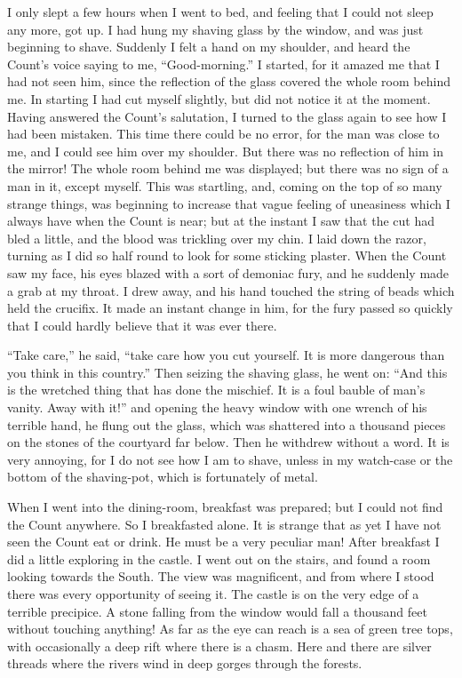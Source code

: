 \documentclass[12pt,openright]{book}
\begin{document}
I only slept a few hours when I went to bed, and feeling that I could not sleep any more, got up. I had hung my shaving glass by the window, and was just beginning to shave. Suddenly I felt a hand on my shoulder, and heard the Count’s voice saying to me, “Good-morning.” I started, for it amazed me that I had not seen him, since the reflection of the glass covered the whole room behind me. In starting I had cut myself slightly, but did not notice it at the moment. Having answered the Count’s salutation, I turned to the glass again to see how I had been mistaken. This time there could be no error, for the man was close to me, and I could see him over my shoulder. But there was no reflection of him in the mirror! The whole room behind me was displayed; but there was no sign of a man in it, except myself. This was startling, and, coming on the top of so many strange things, was beginning to increase that vague feeling of uneasiness which I always have when the Count is near; but at the instant I saw that the cut had bled a little, and the blood was trickling over my chin. I laid down the razor, turning as I did so half round to look for some sticking plaster. When the Count saw my face, his eyes blazed with a sort of demoniac fury, and he suddenly made a grab at my throat. I drew away, and his hand touched the string of beads which held the crucifix. It made an instant change in him, for the fury passed so quickly that I could hardly believe that it was ever there.

“Take care,” he said, “take care how you cut yourself. It is more dangerous than you think in this country.” Then seizing the shaving glass, he went on: “And this is the wretched thing that has done the mischief. It is a foul bauble of man’s vanity. Away with it!” and opening the heavy window with one wrench of his terrible hand, he flung out the glass, which was shattered into a thousand pieces on the stones of the courtyard far below. Then he withdrew without a word. It is very annoying, for I do not see how I am to shave, unless in my watch-case or the bottom of the shaving-pot, which is fortunately of metal.

When I went into the dining-room, breakfast was prepared; but I could not find the Count anywhere. So I breakfasted alone. It is strange that as yet I have not seen the Count eat or drink. He must be a very peculiar man! After breakfast I did a little exploring in the castle. I went out on the stairs, and found a room looking towards the South. The view was magnificent, and from where I stood there was every opportunity of seeing it. The castle is on the very edge of a terrible precipice. A stone falling from the window would fall a thousand feet without touching anything! As far as the eye can reach is a sea of green tree tops, with occasionally a deep rift where there is a chasm. Here and there are silver threads where the rivers wind in deep gorges through the forests.
\end{document}
